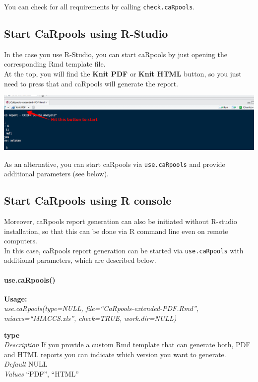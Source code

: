 \documentclass[]{article}
\let\oldparagraph\paragraph
\renewcommand{\paragraph}[1]{\oldparagraph{#1}\mbox{}}
\begin{document}
You can check for all requirements by calling \texttt{check.caRpools}.

\subsection{Start CaRpools using
R-Studio}\label{start-carpools-using-r-studio}

In the case you use R-Studio, you can start caRpools by just opening the
corresponding Rmd template file.\\
At the top, you will find the \textbf{Knit PDF} or \textbf{Knit HTML}
button, so you just need to press that and caRpools will generate the
report.

\includegraphics{./pictures/rstudio-knit.png}

As an alternative, you can start caRpools via \texttt{use.caRpools} and
provide additional parameters (see below).

\subsection{Start CaRpools using R
console}\label{start-carpools-using-r-console}

Moreover, caRpools report generation can also be initiated without
R-studio installation, so that this can be done via R command line even
on remote computers.\\
In this case, caRpools report generation can be started via
\texttt{use.caRpools} with additional parameters, which are described
below.

\paragraph{use.caRpools()}\label{use.carpools}

\textbf{Usage:}\\
\emph{use.caRpools(type=NULL, file=``CaRpools-extended-PDF.Rmd'',
miaccs=``MIACCS.xls'', check=TRUE, work.dir=NULL)}

\textbf{type}\\
\emph{Description} If you provide a custom Rmd template that can
generate both, PDF and HTML reports you can indicate which version you
want to generate.\\
\emph{Default} NULL\\
\emph{Values} ``PDF'', ``HTML''
\end{document}
